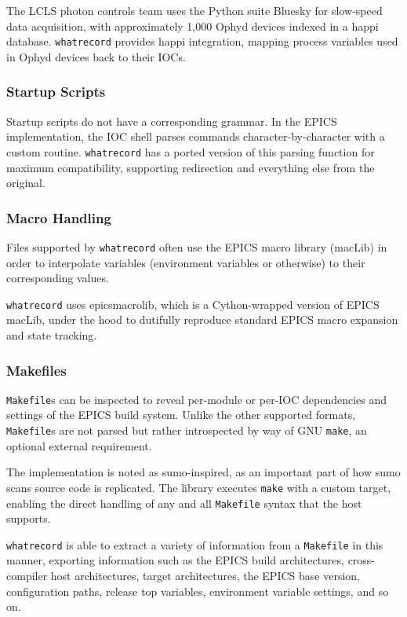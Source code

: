 \documentclass[letter,
               keeplastbox,   %
               ]{jacow}
\begin{document}
The LCLS photon controls team uses the Python suite Bluesky\cite{bluesky} for
slow-speed data acquisition, with approximately 1,000 Ophyd devices indexed in
a happi\cite{happi} database.  \verb_whatrecord_ provides happi integration,
mapping process variables used in Ophyd devices back to their IOCs.

\subsubsection{Startup Scripts} Startup scripts do not have a corresponding
grammar. In the EPICS implementation, the IOC shell parses commands
character-by-character with a custom routine.  \verb_whatrecord_ has a ported
version of this parsing function for maximum compatibility, supporting
redirection and everything else from the original.

\subsubsection{Macro Handling} Files supported by \verb_whatrecord_ often use
the EPICS macro library (macLib) in order to interpolate variables (environment
variables or otherwise) to their corresponding values.

\verb_whatrecord_ uses epicsmacrolib, which is a Cython-wrapped version of
EPICS macLib, under the hood to dutifully reproduce standard EPICS macro
expansion and state tracking.

\subsubsection{Makefiles} \verb_Makefile_s can be inspected to reveal
per-module or per-IOC dependencies and settings of the EPICS build system.
Unlike the other supported formats, \verb_Makefile_s are not parsed but rather
introspected by way of GNU \verb_make_, an optional external requirement.

The implementation is noted as sumo-inspired, as an important part
of how sumo scans source code is replicated. The library executes \verb_make_
with a custom target, enabling the direct handling of any and all
\verb_Makefile_ syntax that the host supports.

\verb_whatrecord_ is able to extract a variety of information from a
\verb_Makefile_ in this manner, exporting information such as the EPICS build
architectures, cross-compiler host architectures, target architectures, the
EPICS base version, configuration paths, release top variables, environment
variable settings, and so on.
\end{document}
